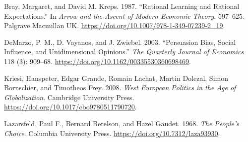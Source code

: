 \documentclass[
]{article}
\newlength{\cslhangindent}
\newlength{\cslentryspacingunit} %
\newenvironment{CSLReferences}[2] %
 {%
  \setlength{\parindent}{0pt}
  \ifodd #1
  \let\oldpar\par
  \def\par{\hangindent=\cslhangindent\oldpar}
  \fi
  \setlength{\parskip}{#2\cslentryspacingunit}
 }%
 {}
\begin{document}
\hypertarget{refs}{}
\begin{CSLReferences}{1}{0}
\leavevmode{}%
Bray, Margaret, and David M. Kreps. 1987. {``Rational Learning and Rational Expectations.''} In \emph{Arrow and the Ascent of Modern Economic Theory}, 597--625. Palgrave Macmillan {UK}. \url{https://doi.org/10.1007/978-1-349-07239-2_19}.

\leavevmode{}%
DeMarzo, P. M., D. Vayanos, and J. Zwiebel. 2003. {``Persuasion Bias, Social Influence, and Unidimensional Opinions.''} \emph{The Quarterly Journal of Economics} 118 (3): 909--68. \url{https://doi.org/10.1162/00335530360698469}.

\leavevmode{}%
Kriesi, Hanspeter, Edgar Grande, Romain Lachat, Martin Dolezal, Simon Bornschier, and Timotheos Frey. 2008. \emph{West European Politics in the Age of Globalization}. Cambridge University Press. \url{https://doi.org/10.1017/cbo9780511790720}.

\leavevmode{}%
Lazarsfeld, Paul F., Bernard Berelson, and Hazel Gaudet. 1968. \emph{The People's Choice}. Columbia University Press. \url{https://doi.org/10.7312/laza93930}.

\end{CSLReferences}
\end{document}
